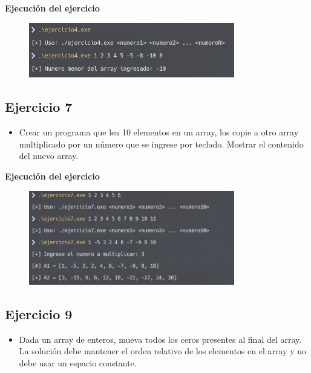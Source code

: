 \documentclass{article}
\begin{document}
        

        \textbf{Ejecución del ejercicio}
        \begin{figure}[H]
        	\centering
         	\includegraphics[width=0.8\textwidth,keepaspectratio]{img/ejercicio4.png}
        \end{figure}

    
    \subsection{Ejercicio 7}
        \begin{itemize}
            \item Crear un programa que lea 10 elementos en un array, los copie a otro array multiplicado por
            un número que se ingrese por teclado. Mostrar el contenido del nuevo array.
        \end{itemize}
        
        

        \textbf{Ejecución del ejercicio}
        \begin{figure}[H]
        	\centering
         	\includegraphics[width=0.8\textwidth,keepaspectratio]{img/ejercicio7.png}
        \end{figure}
        
    
    \subsection{Ejercicio 9}
        \begin{itemize}
            \item Dada un array de enteros, mueva todos los ceros presentes al final del array. La solución
            debe mantener el orden relativo de los elementos en el array y no debe usar un espacio constante.
        \end{itemize}
        
\end{document}
